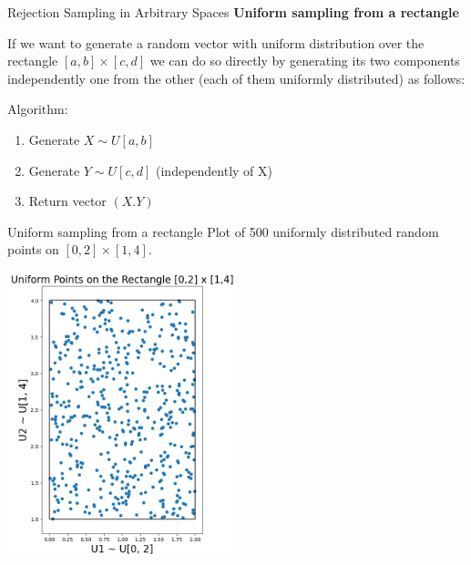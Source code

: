 \documentclass[8pt]{beamer}
\begin{document}
\begin{frame}{Rejection Sampling in Arbitrary Spaces}
\textbf{Uniform sampling from a rectangle}

\vspace{2mm}

If we want to generate a random vector with uniform distribution over the rectangle $[a,b]\times[c,d]$ we can do so directly by generating its two components independently one from the other (each of them uniformly distributed) as follows:
\vspace{2mm}

\alert{Algorithm}:

\begin{enumerate}
\item Generate $X \sim U[a,b]$
\item Generate $Y \sim U[c,d]$ (independently of X)
\item Return vector $(X.Y)$
\end{enumerate}
\end{frame}

\begin{frame}{Uniform sampling from a rectangle}
Plot of 500 uniformly distributed random points on $[0,2]\times[1,4]$.

\begin{center}
\includegraphics[width=0.5\textwidth]{chapter1-part4-plot2.png}
\end{center}
\end{frame}
\end{document}
